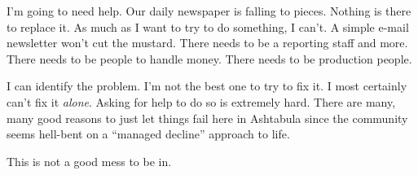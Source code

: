 I'm going to need help. Our daily newspaper is falling to pieces.
Nothing is there to replace it. As much as I want to try to do
something, I can't. A simple e-mail newsletter won't cut the mustard.
There needs to be a reporting staff and more. There needs to be people
to handle money. There needs to be production people.

I can identify the problem. I'm not the best one to try to fix it. I
most certainly can't fix it \emph{alone}. Asking for help to do so is
extremely hard. There are many, many good reasons to just let things
fail here in Ashtabula since the community seems hell-bent on a
``managed decline'' approach to life.

This is not a good mess to be in.
